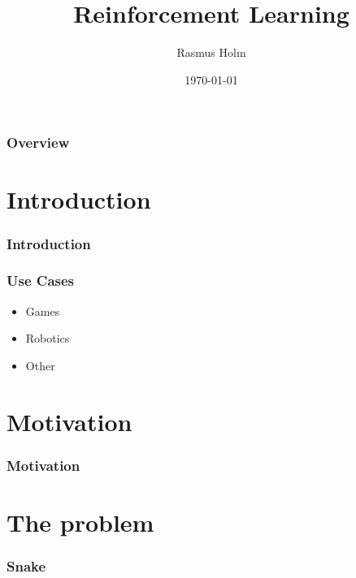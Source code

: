 \documentclass{beamer}
\title[Reinforcement Learning]{Reinforcement Learning}
\author[Rasmus Holm]{Rasmus Holm}
\institute[LiU]{
Linköping University \\
}
\date{\today}
\begin{document}

    \begin{frame}
        \titlepage
    \end{frame}

    \begin{frame}
        \frametitle{Overview}
        \tableofcontents
    \end{frame}

    \section{Introduction}

    \begin{frame}
        \frametitle{Introduction}
    \end{frame}

    \begin{frame}
        \frametitle{Use Cases}

        \begin{itemize}
            \item Games
            \item Robotics
            \item Other
        \end{itemize}
    \end{frame}

    \section{Motivation}

    \begin{frame}
        \frametitle{Motivation}
    \end{frame}

    \section{The problem}

    \begin{frame}
        \frametitle{Snake}
        \centering
    \end{frame}
\end{document}

